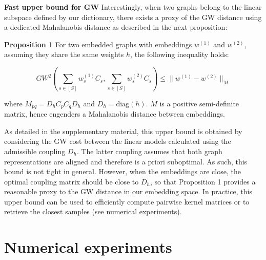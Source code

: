 \documentclass[preprint,11pt]{elsarticle}
\begin{document}
\textbf{Fast upper bound for GW} Interestingly, when two graphs belong to the linear subspace defined by our dictionary, there exists a proxy of the GW distance using a dedicated Mahalanobis distance as described in the next proposition:

\textbf{Proposition 1} For two embedded graphs with embeddings \( w^{(1)} \) and \( w^{(2)} \), assuming they share the same weights \( h \), the following inequality holds:

\begin{equation}
    GW^2\left(\sum_{s \in [S]} w^{(1)}_s C_s, \sum_{s \in [S]} w^{(2)}_s C_s\right) \leq \|w^{(1)} - w^{(2)}\|_M
\end{equation}

where \( M_{pq} = D_h C_p C_q D_h \) and \( D_h = \text{diag}(h) \). \( M \) is a positive semi-definite matrix, hence engenders a Mahalanobis distance between embeddings. 

As detailed in the supplementary material, this upper bound is obtained by considering the GW cost between the linear models calculated using the admissible coupling \( D_h \). The latter coupling assumes that both graph representations are aligned and therefore is a priori suboptimal. As such, this bound is not tight in general. However, when the embeddings are close, the optimal coupling matrix should be close to \( D_h \), so that Proposition 1 provides a reasonable proxy to the GW distance in our embedding space. In practice, this upper bound can be used to efficiently compute pairwise kernel matrices or to retrieve the closest samples (see numerical experiments).

\section{Numerical experiments}
\end{document}

